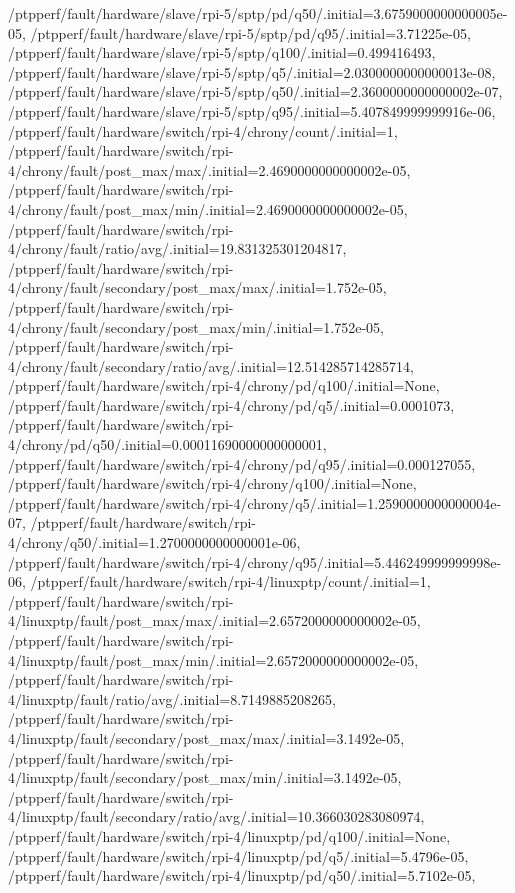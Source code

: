{    /ptpperf/fault/hardware/slave/rpi-5/sptp/pd/q50/.initial=3.6759000000000005e-05,
    /ptpperf/fault/hardware/slave/rpi-5/sptp/pd/q95/.initial=3.71225e-05,
    /ptpperf/fault/hardware/slave/rpi-5/sptp/q100/.initial=0.499416493,
    /ptpperf/fault/hardware/slave/rpi-5/sptp/q5/.initial=2.0300000000000013e-08,
    /ptpperf/fault/hardware/slave/rpi-5/sptp/q50/.initial=2.3600000000000002e-07,
    /ptpperf/fault/hardware/slave/rpi-5/sptp/q95/.initial=5.407849999999916e-06,
    /ptpperf/fault/hardware/switch/rpi-4/chrony/count/.initial=1,
    /ptpperf/fault/hardware/switch/rpi-4/chrony/fault/post_max/max/.initial=2.4690000000000002e-05,
    /ptpperf/fault/hardware/switch/rpi-4/chrony/fault/post_max/min/.initial=2.4690000000000002e-05,
    /ptpperf/fault/hardware/switch/rpi-4/chrony/fault/ratio/avg/.initial=19.831325301204817,
    /ptpperf/fault/hardware/switch/rpi-4/chrony/fault/secondary/post_max/max/.initial=1.752e-05,
    /ptpperf/fault/hardware/switch/rpi-4/chrony/fault/secondary/post_max/min/.initial=1.752e-05,
    /ptpperf/fault/hardware/switch/rpi-4/chrony/fault/secondary/ratio/avg/.initial=12.514285714285714,
    /ptpperf/fault/hardware/switch/rpi-4/chrony/pd/q100/.initial=None,
    /ptpperf/fault/hardware/switch/rpi-4/chrony/pd/q5/.initial=0.0001073,
    /ptpperf/fault/hardware/switch/rpi-4/chrony/pd/q50/.initial=0.00011690000000000001,
    /ptpperf/fault/hardware/switch/rpi-4/chrony/pd/q95/.initial=0.000127055,
    /ptpperf/fault/hardware/switch/rpi-4/chrony/q100/.initial=None,
    /ptpperf/fault/hardware/switch/rpi-4/chrony/q5/.initial=1.2590000000000004e-07,
    /ptpperf/fault/hardware/switch/rpi-4/chrony/q50/.initial=1.2700000000000001e-06,
    /ptpperf/fault/hardware/switch/rpi-4/chrony/q95/.initial=5.446249999999998e-06,
    /ptpperf/fault/hardware/switch/rpi-4/linuxptp/count/.initial=1,
    /ptpperf/fault/hardware/switch/rpi-4/linuxptp/fault/post_max/max/.initial=2.6572000000000002e-05,
    /ptpperf/fault/hardware/switch/rpi-4/linuxptp/fault/post_max/min/.initial=2.6572000000000002e-05,
    /ptpperf/fault/hardware/switch/rpi-4/linuxptp/fault/ratio/avg/.initial=8.7149885208265,
    /ptpperf/fault/hardware/switch/rpi-4/linuxptp/fault/secondary/post_max/max/.initial=3.1492e-05,
    /ptpperf/fault/hardware/switch/rpi-4/linuxptp/fault/secondary/post_max/min/.initial=3.1492e-05,
    /ptpperf/fault/hardware/switch/rpi-4/linuxptp/fault/secondary/ratio/avg/.initial=10.366030283080974,
    /ptpperf/fault/hardware/switch/rpi-4/linuxptp/pd/q100/.initial=None,
    /ptpperf/fault/hardware/switch/rpi-4/linuxptp/pd/q5/.initial=5.4796e-05,
    /ptpperf/fault/hardware/switch/rpi-4/linuxptp/pd/q50/.initial=5.7102e-05,
}

